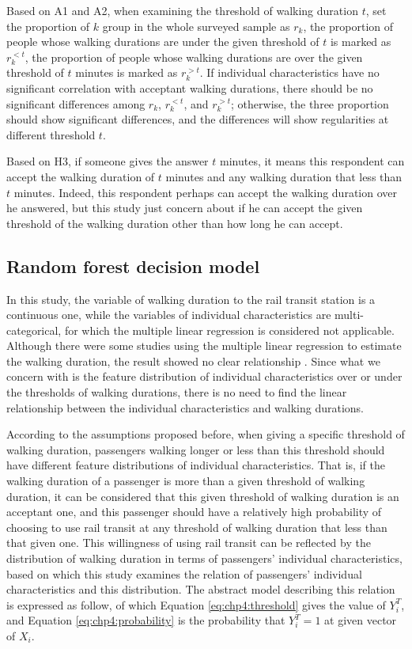 Based on A1 and A2, when examining the threshold of walking duration $t$, set the proportion of $k$ group in the whole surveyed sample as $r_k$, the proportion of people whose walking durations are under the given threshold of $t$ is marked as $r_{k}^{<t}$, the proportion of people whose walking durations are over the given threshold of $t$ minutes is marked as $r_{k}^{>t}$. If individual characteristics have no significant correlation with acceptant walking durations, there should be no significant differences among $r_k$, $r_{k}^{<t}$, and $r_{k}^{>t}$; otherwise, the three proportion should show significant differences, and the differences will show regularities at different threshold $t$.

Based on H3, if someone gives the answer $t$ minutes, it means this respondent can accept the walking duration of $t$ minutes and any walking duration that less than $t$ minutes. Indeed, this respondent perhaps can accept the walking duration over he answered, but this study just concern about if he can accept the given threshold of the walking duration other than how long he can accept.

%
\subsection{Random forest decision model}
%
In this study, the variable of walking duration to the rail transit station is a continuous one, while the variables of individual characteristics are multi-categorical, for which the multiple linear regression is considered not applicable. Although there were some studies using the multiple linear regression to estimate the walking duration, the result showed no clear relationship \cite{krygsman2004multimodal}. Since what we concern with is the feature distribution of individual characteristics over or under the thresholds of walking durations, there is no need to find the linear relationship between the individual characteristics and walking durations.

%
According to the assumptions proposed before, when giving a specific threshold of walking duration, passengers walking longer or less than this threshold should have different feature distributions of individual characteristics. That is, if the walking duration of a passenger is more than a given threshold of walking duration, it can be considered that this given threshold of walking duration is an acceptant one, and this passenger should have a relatively high probability of choosing to use rail transit at any threshold of walking duration that less than that given one. This willingness of using rail transit can be reflected by the distribution of walking duration in terms of passengers' individual characteristics, based on which this study examines the relation of passengers' individual characteristics and this distribution. The abstract model describing this relation is expressed as follow, of which Equation \ref{eq:chp4:threshold} gives the value of $Y^T_i$, and Equation \ref{eq:chp4:probability} is the probability that $Y^T_i=1$ at given vector of $X_i$.

